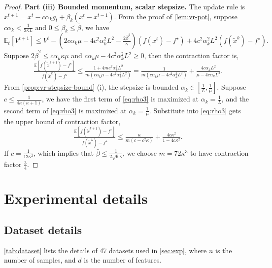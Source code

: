 \documentclass{article}
\theoremstyle{definition}
\begin{document}
\begin{proof}
  \textbf{Part (iii) Bounded momentum, scalar stepsize.} The update rule is
  $x^{t + 1} = x^t - c \alpha_k g_t + \beta_k (x^t - x^{t - 1})$. From the
  proof of \cref{lem:vr-pot}, suppose $c \alpha_k < \tfrac{1}{2 \kappa L}$ and $0
  \leq \beta_k \leq \bar{\beta}$, we have
  \begin{equation*}
    \mathbb{E}_t [V^{t + 1}]  \leq  V^t - \left( 2 c \alpha_k \mu - 4 c^2
    \alpha_k^2 L^2 - \tfrac{2 \bar{\beta}^2}{\kappa} \right) (f (x^t) -
    f^{\star}) + 4 c^2 \alpha_k^2 L^2 (f (\tilde{x}^k) - f^{\star}) .
  \end{equation*}
  Suppose $2 \bar{\beta}^2 \leq c \alpha_k \kappa \mu$ and $c \alpha_k \mu - 4
  c^2 \alpha_k^2 L^2 \geq 0$, then the contraction factor is,
  \begin{equation}
    \tfrac{\mathbb{E} [f (\tilde{x}^{k + 1}) - f^{\star}]}{f (\tilde{x}^k) -
    f^{\star}} \leq \tfrac{1 + 4 m c^2 \alpha_k^2 L^2}{m (c \alpha_k \mu - 4
    c^2 \alpha_k^2 L^2)} = \tfrac{1}{m (c \alpha_k \mu - 4 c^2 \alpha_k^2
    L^2)} + \tfrac{4 c \alpha_k L^2}{\mu - 4 c \alpha_k L^2} . \label{eq:rho3}
  \end{equation}
  From \cref{prop:vr-stepsize-bound} (i), the stepsize is bounded $\alpha_k \in \left[ \tfrac{1}{L},
  \tfrac{1}{\mu} \right]$. Suppose $c \leq \tfrac{1}{4 \kappa (\kappa + 1)}$,
  we have the first term of \eqref{eq:rho3} is maximized at $\alpha_k =
  \tfrac{1}{L}$, and the second term of \eqref{eq:rho3} is maximized at
  $\alpha_k = \tfrac{1}{\mu}$. Substitute into \eqref{eq:rho3} gets the upper
  bound of contraction factor,
  \[ \tfrac{\mathbb{E} [f (\tilde{x}^{k + 1}) - f^{\star}]}{f (\tilde{x}^k) -
     f^{\star}} \leq \tfrac{\kappa}{m (c - c^2 \kappa)} + \tfrac{4 c
     \kappa^2}{1 - 4 c \kappa^2} . \]
  If $c = \tfrac{1}{12 \kappa^2}$, which implies that $\bar{\beta} \leq
  \tfrac{1}{2 \sqrt{6} \kappa}$, we choose $m = 72 \kappa^3$ to have
  contraction factor $\tfrac{3}{4}$.
\end{proof}


\section{Experimental details}

\subsection{Dataset details} \label{app:exp-dataset}

\cref{tab:dataset} lists the details of 47 datasets used in \cref{sec:exp}, where $n$ is the number of samples, and $d$ is the number of features. 
\end{document}
